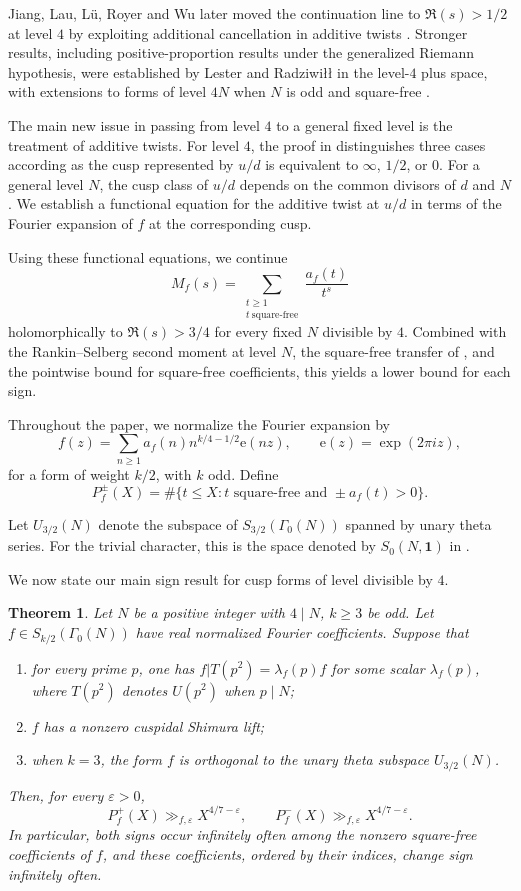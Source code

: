 \documentclass[11pt]{amsart}
\newtheorem{theorem}{Theorem}[section]
\theoremstyle{remark}
\newcommand{\e}{\mathrm{e}}
\begin{document}
Jiang, Lau, L\"u, Royer and Wu later moved the continuation line to
$\Re(s)>1/2$ at level $4$ by exploiting additional cancellation in
additive twists \cite{JLRW}. Stronger results, including
positive-proportion results under the generalized Riemann hypothesis,
were established by Lester and Radziwi\l\l{} in the level-$4$ plus space,
with extensions to forms of level $4N$ when $N$ is odd and square-free
\cite{LesterRadz}.

The main new issue in passing from level $4$ to a general fixed level
is the treatment of additive twists. For level \(4\), the proof in
\cite{HKKL} distinguishes three cases according as the cusp represented by
\(u/d\) is equivalent to \(\infty\), \(1/2\), or \(0\).
For a general level \(N\), the cusp class of \(u/d\) depends on the
common divisors of \(d\) and \(N\). We establish a functional equation
for the additive twist at \(u/d\) in terms of the Fourier expansion of
\(f\) at the corresponding cusp. 

Using these functional equations, we continue
\[
M_f(s)=\sum_{\substack{t\geq1\\t\ \mathrm{square\text{-}free}}}
\frac{a_f(t)}{t^s}
\]
holomorphically to $\Re(s)>3/4$ for every fixed \(N\) divisible by \(4\). Combined with the Rankin--Selberg second moment at level
$N$, the square-free transfer of \cite[Lemma~9]{LRW}, and the pointwise
bound for square-free coefficients, this yields a lower bound
for each sign.

Throughout the paper, we normalize the Fourier expansion by
\[
f(z)=\sum_{n\ge1}a_f(n)n^{k/4-1/2}\e(nz),\qquad \e(z)=\exp(2\pi iz),
\]
for a form of weight $k/2$, with $k$ odd. Define
\[
P_f^\pm(X)=\#\{t\le X:t\text{ square-free and }\pm a_f(t)>0\}.
\]

Let $U_{3/2}(N)$ denote the subspace of $S_{3/2}(\Gamma_0(N))$ spanned
by unary theta series. For the trivial character, this is the space denoted
by $S_0(N,\mathbf 1)$ in \cite{PurkaitDecomposition}.

We now state our main sign result for cusp forms of level divisible by $4$.

\begin{theorem}\label{thm:general}
Let $N$ be a positive integer with $4\mid N$, $k\ge 3$ be odd. Let
$f\in S_{k/2}(\Gamma_0(N))$
have real normalized Fourier coefficients. Suppose that
\begin{enumerate}[label=\textup{(\arabic*)}]
\item for every prime $p$, one has
$f|T(p^2)=\lambda_f(p)f$ for some scalar $\lambda_f(p)$, where
$T(p^2)$ denotes $U(p^2)$ when $p\mid N$;
\item $f$ has a nonzero cuspidal Shimura lift;
\item when $k=3$, the form $f$ is orthogonal to the unary theta subspace
$U_{3/2}(N)$.
\end{enumerate}
Then, for every $\varepsilon>0$,
\[
P_f^+(X)\gg_{f,\varepsilon}X^{4/7-\varepsilon},\qquad
P_f^-(X)\gg_{f,\varepsilon}X^{4/7-\varepsilon}.
\]
In particular, both signs occur infinitely often among the nonzero
square-free coefficients of $f$, and these coefficients, ordered by their
indices, change sign infinitely often.
\end{theorem}
\end{document}
